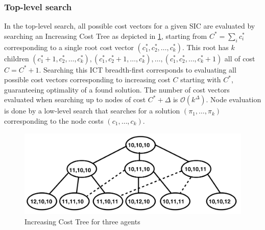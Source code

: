\documentclass[english,10pt]{article}
\begin{document}
	\subsubsection{Top-level search}
	In the top-level search, all possible cost vectors for a given SIC are evaluated by searching an Increasing Cost Tree as depicted in \ref{fig:ict}, starting from $C^* = \sum_i c^*_i$ corresponding to a single root cost vector $(c^*_1,c^*_2,\ldots,c^*_k)$. This root has $k$ children $(c^*_1 + 1,c^*_2,\ldots,c^*_k),(c^*_1,c^*_2 + 1,\ldots,c^*_k),\ldots,(c^*_1,c^*_2,\ldots,c^*_k + 1)$ all of cost $C = C^* + 1$. Searching this ICT breadth-first corresponds to evaluating all possible cost vectors corresponding to increasing cost $C$ starting with $C^*$, guaranteeing optimality of a found solution. The number of cost vectors evaluated when searching up to nodes of cost $C^* + \Delta$ is $\mathcal{O}(k^\Delta)$. Node evaluation is done by a low-level search that searches for a solution $(\pi_1,\ldots,\pi_k)$ corresponding to the node costs $(c_1,\ldots,c_k)$.
	
	\begin{figure}[t]
		\centering
		\includegraphics[width=0.5\linewidth]{img/ict}
		\caption{Increasing Cost Tree for three agents \cite{sharon2011}}
		\label{fig:ict}
		\vspace{-30pt}
	\end{figure}
	\begin{figure}
		
	\end{figure}
	
\end{document}
